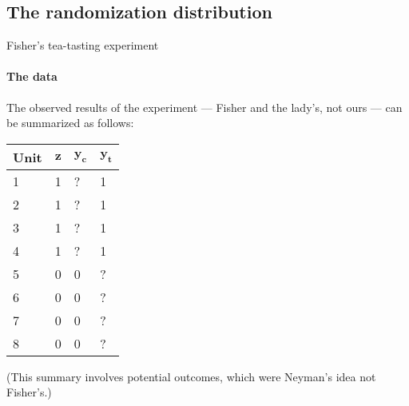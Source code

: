 \subsection{The randomization distribution }

\begin{frame}{Fisher's tea-tasting experiment}
  \framesubtitle{The data}

The observed results of the experiment --- Fisher and the lady's, not
ours --- can be summarized as follows:
  
\begin{center}
    \begin{tabular}{l|l|ll|}
    Unit & $\mathbf{z}$ & $\mathbf{y_c}$ & $\mathbf{y_t}$ \\ \hline
    1    & 1          & ?                & 1 \\
    2    & 1          & ?                & 1  \\
    3    & 1          & ?                & 1  \\
    4    & 1          & ?                & 1  \\
    5    & 0          & 0                & ?  \\
    6    & 0          & 0                & ?  \\
    7    & 0          & 0                & ?  \\
    8    & 0          & 0                & ?  \\
    \end{tabular}
\end{center}  

(This summary involves potential outcomes, which were Neyman's idea
not Fisher's.)
\end{frame}


